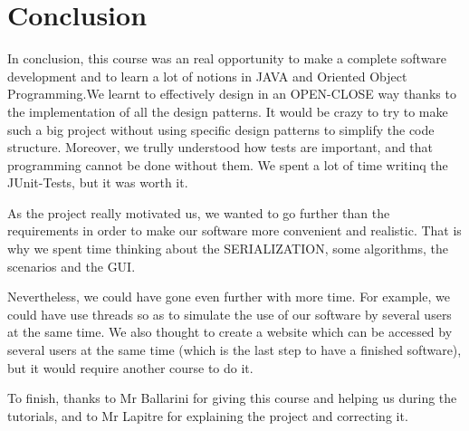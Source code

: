 \section{Conclusion}
In conclusion, this course was an real opportunity to make a complete software development and to learn a lot of notions in JAVA and Oriented Object Programming.We learnt to effectively design in an OPEN-CLOSE way thanks to the implementation of all the design patterns. It would be crazy to try to make such a big project without using specific design patterns to simplify the code structure. Moreover, we trully understood how tests are important, and that programming cannot be done without them. We spent a lot of time writinq the JUnit-Tests, but it was worth it.

As the project really motivated us, we wanted to go further than the requirements in order to make our software more convenient and realistic. That is why we spent time thinking about the SERIALIZATION, some algorithms, the scenarios and the GUI.

Nevertheless, we could have gone even further with more time. For example, we could have use threads so as to simulate the use of our software by several users at the same time. We also thought to create a website which can be accessed by several users at the same time (which is the last step to have a finished software), but it would require another course to do it.


To finish, thanks to Mr Ballarini for giving this course and helping us during the tutorials, and to Mr Lapitre for explaining the project and correcting it.